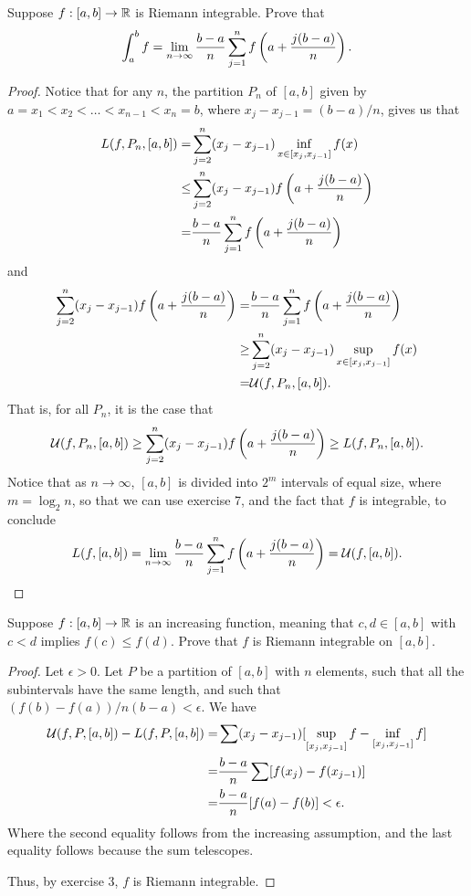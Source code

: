 \begin{exercise}{8}
Suppose $f:[a,b]\to\mathbb{R}$ is Riemann integrable.
Prove that 
\begin{align*}
    \int_a^b f = \lim_{n\to\infty} \frac{b-a}{n}\sum_{j=1}^n f\left( a+\frac{j(b-a)}{n}\right).
\end{align*}
\end{exercise}
\begin{proof}
Notice that for any $n$, the partition $P_n$ of $[a,b]$ given by $a=x_1<x_2<\dots<x_{n-1}<x_n=b$, where $x_j-x_{j-1} = (b-a)/n$, gives us that
\begin{align*}
    L(f, P_n, [a,b]) 
    =& \sum_{j=2}^n (x_j-x_{j-1}) \inf_{x\in[x_j,x_{j-1}]}f(x)\\
    \leq& \sum_{j=2}^n (x_j-x_{j-1}) f\left( a+\frac{j(b-a)}{n}\right)\\
    =& \frac{b-a}{n}\sum_{j=1}^n f\left( a+\frac{j(b-a)}{n}\right) 
\end{align*}
and
\begin{align*}
    \sum_{j=2}^n (x_j-x_{j-1}) f\left( a+\frac{j(b-a)}{n}\right)
    =& \frac{b-a}{n}\sum_{j=1}^n f\left( a+\frac{j(b-a)}{n}\right)\\
    \geq& \sum_{j=2}^n (x_j-x_{j-1}) \sup_{x\in[x_j,x_{j-1}]}f(x)\\
    =& \mathcal{U}(f,P_n,[a,b]).
\end{align*}
That is, for all $P_n$, it is the case that
\begin{align*}
    \mathcal{U}(f,P_n,[a,b]) 
    \geq \sum_{j=2}^n (x_j-x_{j-1}) f\left( a+\frac{j(b-a)}{n}\right)
    \geq L(f,P_n,[a,b]).
\end{align*}
Notice that as $n\to\infty$, $[a,b]$ is divided into $2^m$ intervals of equal size, where $m = \log_2 n$, so that we can use exercise 7, and the fact that $f$ is integrable, to conclude
\begin{align*}
    L(f, [a,b]) = \lim_{n\to\infty} \frac{b-a}{n}\sum_{j=1}^n f\left( a+\frac{j(b-a)}{n}\right) = \mathcal{U}(f,[a,b]).
\end{align*}
\end{proof} 

\begin{exercise}{13}
Suppose $f:[a,b]\to\mathbb{R}$ is an increasing function, meaning that $c,d\in [a,b]$ with $c<d$ implies $f(c)\leq f(d)$.
Prove that $f$ is Riemann integrable on $[a,b]$.
\end{exercise}
\begin{proof}
Let $\epsilon>0$.
Let $P$ be a partition of $[a,b]$ with $n$ elements, such that all the subintervals have the same length, and such that $(f(b)-f(a))/n(b-a)< \epsilon$.
We have
\begin{align*}
    \mathcal{U}(f,P,[a,b]) - L(f,P,[a,b])
    =& \sum (x_j - x_{j-1})[\sup_{[x_j, x_{j-1}]} f - \inf_{[x_j, x_{j-1}]} f]\\
    =& \frac{b-a}{n} \sum [f(x_j) - f(x_{j-1})]\\
    =& \frac{b-a}{n} [f(a) - f(b)] < \epsilon.
\end{align*}
Where the second equality follows from the increasing assumption, and the last equality follows because the sum telescopes.

Thus, by exercise 3, $f$ is Riemann integrable.
\end{proof} 

